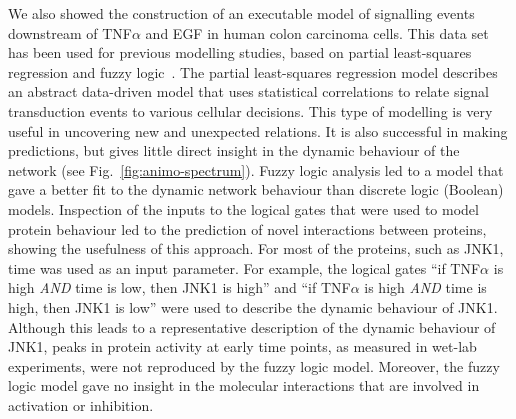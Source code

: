 \documentclass{bmcart}
\begin{document}
We also showed the construction of an executable model
of signalling events downstream of
TNF$\alpha$ and EGF in human colon carcinoma cells. This data set has been used for
previous modelling studies, based on partial least-squares regression and fuzzy
logic~\cite{pathway-leastsquare,pathway-fuzzy}.
The partial least-squares regression model describes an abstract data-driven model
that uses statistical correlations
to relate signal transduction events to various cellular decisions. This type of modelling is
very useful in uncovering new and unexpected relations. It is also successful in making
predictions, but gives little direct insight in the dynamic behaviour of the network (see Fig.~\ref{fig:animo-spectrum}). Fuzzy
logic analysis led to a model that gave a better fit to the dynamic network behaviour than
discrete logic (Boolean) models. Inspection of the inputs to the logical gates that were used
to model protein behaviour led to the prediction of novel interactions between proteins,
showing the usefulness of this approach. For most of the proteins, such as JNK1, time was
used as an input parameter. For example, the logical gates ``if TNF$\alpha$ is high
\emph{AND} time is low, then JNK1 is high'' and ``if TNF$\alpha$ is high \emph{AND} time is
high, then JNK1 is low'' were used to
describe the dynamic behaviour of JNK1. Although this leads to a representative
description of the dynamic behaviour of JNK1, peaks in protein activity at early time points,
as measured in wet-lab experiments, were
not reproduced by the fuzzy logic model. Moreover, the fuzzy logic model gave no insight in the molecular interactions
that are involved in activation or inhibition.
\end{document}
